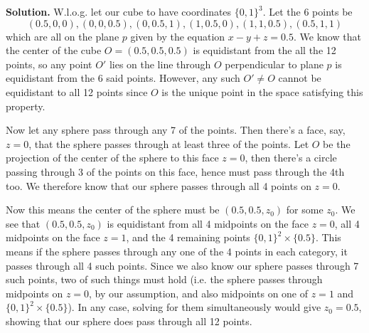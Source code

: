 \documentclass[11pt,a4paper]{article}
\begin{document}
\begin{enumerate}
    \textbf{Solution.} 
    W.l.o.g. let our cube to have coordinates $\{0, 1\}^3$. 
    Let the 6 points be 
    \[
    (0.5, 0, 0), (0, 0, 0.5), (0, 0.5, 1), (1, 0.5, 0), (1, 1, 0.5), (0.5, 1, 1)
    \]
    which are all on the plane $p$ given by the equation $x-y+z=0.5$. 
    We know that the center of the cube $O=(0.5, 0.5, 0.5)$ is equidistant from the all the 12 points, 
    so any point $O'$ lies on the line through $O$ perpendicular to plane $p$ is equidistant from the 6 said points. 
    However, any such $O'\neq O$ cannot be equidistant to all 12 points since $O$ is the unique point in the space satisfying this property. 
    
    Now let any sphere pass through any 7 of the points. 
    Then there's a face, say, $z=0$, that the sphere passes through at least three of the points. 
    Let $O$ be the projection of the center of the sphere to this face $z=0$, 
    then there's a circle passing through 3 of the points on this face, hence must pass through the 4th too. 
    We therefore know that our sphere passes through all 4 points on $z=0$. 
    
    Now this means the center of the sphere must be $(0.5, 0.5, z_0)$ for some $z_0$. 
    We see that $(0.5, 0.5, z_0)$ is equidistant from all 4 midpoints on the face $z=0$, 
    all 4 midpoints on the face $z=1$, and the 4 remaining points $\{0, 1\}^2\times \{0.5\}$. 
    This means if the sphere passes through any one of the 4 points in each category, 
    it passes through all 4 such points. 
    Since we also know our sphere passes through 7 such points, 
    two of such things must hold (i.e. the sphere passes through midpoints on $z=0$, by our assumption, and also midpoints on one of $z=1$ and $\{0, 1\}^2\times \{0.5\}$). 
    In any case, solving for them simultaneously would give $z_0=0.5$, 
    showing that our sphere does pass through all 12 points. 
\end{enumerate}
    
\end{document}
